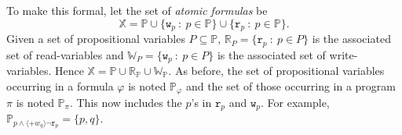 \documentclass{llncs}
\newcommand{\atm}{x}
\newcommand{\atmb}{y}
\newcommand{\atmset}{\mathtt{\mathbb X}}	%
\newcommand{\readOf}[1]{\mathbb{R}_{#1}}
\newcommand{\readable}[1]{\mathtt{r}_{#1}}
\newcommand{\writable}[1]{\mathtt{w}_{#1}}
\newcommand{\writeOf}[1]{\mathbb{W}_{#1}}
\newcommand{\assgntopV}[1]{{\mathtt {+} #1}}
\newcommand{\ldia}[1]{ \big\langle #1 \big\rangle}
\renewcommand{\phi}{\varphi}
\newcommand{\propset}{\mathbb P}
\newcommand{\propsetOf}[1]{\propset_{#1}}
\newcommand{\suchthat}{~ : ~}
\begin{document}
To make this formal, let the set of \emph{atomic formulas} be
$$ \atmset = \propset \cup \{ \writable{p} \suchthat p \in \propset \} \cup \{ \readable p \suchthat p \in \propset \} . $$
Given a set of propositional variables $P \subseteq \propset$, 
$\readOf P = \{ \readable p \suchthat p \in P \}$ 
is the associated set of read-variables and 
$\writeOf P = \{ \writable{p} \suchthat p \in P \}$ 
is the associated set of write-variables. 
Hence $\atmset = \propset \cup \readOf \propset \cup \writeOf \propset$. 
%
As before, the set of propositional variables occurring in a formula $\phi$ is noted $\propsetOf \phi $ and 
the set of those occurring in a program $\pi$ is noted $\propsetOf \pi $. %
This now includes the $p$'s in $\readable p$ and $\writable{p}$. 
For example, $\propsetOf{ p \land \ldia{\assgntopV{w_q} } \lnot \readable p } = \{p,q\}$. %
\end{document}

